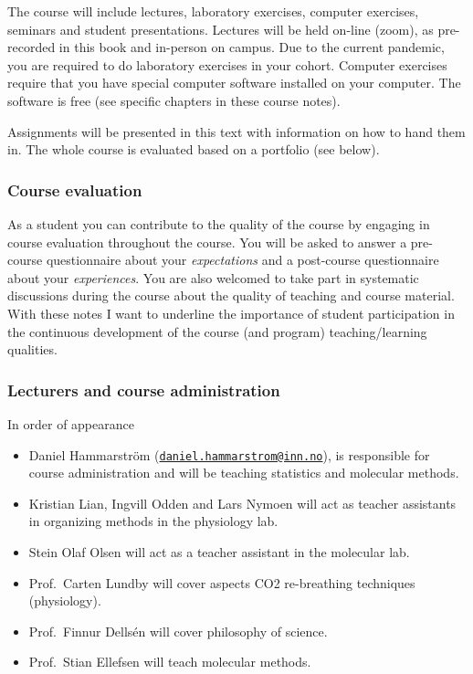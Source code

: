 \documentclass[
]{article}
\providecommand{\tightlist}{%
  \setlength{\itemsep}{0pt}\setlength{\parskip}{0pt}}
\begin{document}
The course will include lectures, laboratory exercises, computer exercises, seminars and student presentations. Lectures will be held on-line (zoom), as pre-recorded in this book and in-person on campus. Due to the current pandemic, you are required to do laboratory exercises in your cohort.
Computer exercises require that you have special computer software installed on your computer. The software is free (see specific chapters in these course notes).

Assignments will be presented in this text with information on how to hand them in. The whole course is evaluated based on a portfolio (see below).

\hypertarget{course-evaluation}{%
\subsubsection{Course evaluation}\label{course-evaluation}}

As a student you can contribute to the quality of the course by engaging in course evaluation throughout the course. You will be asked to answer a pre-course questionnaire about your \emph{expectations} and a post-course questionnaire about your \emph{experiences}. You are also welcomed to take part in systematic discussions during the course about the quality of teaching and course material. With these notes I want to underline the importance of student participation in the continuous development of the course (and program) teaching/learning qualities.

\hypertarget{lecturers-and-course-administration}{%
\subsubsection{Lecturers and course administration}\label{lecturers-and-course-administration}}

In order of appearance

\begin{itemize}
\tightlist
\item
  Daniel Hammarström (\href{mailto:daniel.hammarstrom@inn.no}{\nolinkurl{daniel.hammarstrom@inn.no}}), is responsible for course administration and will be teaching statistics and molecular methods.
\item
  Kristian Lian, Ingvill Odden and Lars Nymoen will act as teacher assistants in organizing methods in the physiology lab.
\item
  Stein Olaf Olsen will act as a teacher assistant in the molecular lab.
\item
  Prof.~Carten Lundby will cover aspects CO2 re-breathing techniques (physiology).
\item
  Prof.~Finnur Dellsén will cover philosophy of science.
\item
  Prof.~Stian Ellefsen will teach molecular methods.
\end{itemize}
\end{document}
